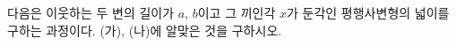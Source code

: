 \noindent\begin{minipage}[t]{0.58\linewidth}\vspace{0pt}\raggedright 다음은 이웃하는 두 변의 길이가 $a$, $b$이고 그 끼인각 $x$가 둔각인 평행사변형의 넓이를 구하는 과정이다. (가), (나)에 알맞은 것을 구하시오. \end{minipage}\hfill\begin{minipage}[t]{0.4\linewidth}\vspace{0pt}\centering \resizebox{\ifdim\width>\linewidth\linewidth\else\width\fi}{!}{}\end{minipage}\par
\noindent {}
